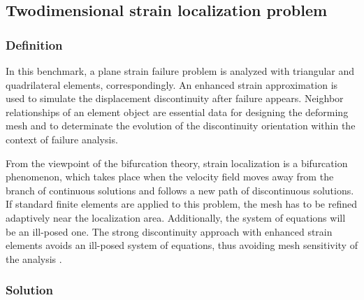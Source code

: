 \subsection{Twodimensional strain localization problem}
\label{subsec:Mp2}

\subsubsection{Definition}
\label{subsubsec:Mp2_def}

In this benchmark, a plane strain failure problem is analyzed with triangular and quadrilateral elements, correspondingly. An enhanced strain approximation is used to simulate the displacement discontinuity after failure appears. Neighbor relationships of an element object are essential data for designing the deforming mesh and to determinate the evolution of the discontinuity orientation within the context of failure analysis.

From the viewpoint of the bifurcation theory, strain localization is a bifurcation phenomenon, which takes place when the velocity field moves away from the branch of continuous solutions and follows a new
path of discontinuous solutions. If standard finite elements are applied to this problem, the mesh has to be refined adaptively near the localization area. Additionally, the system of equations will be an ill-posed one. The strong discontinuity approach with enhanced strain elements avoids an ill-posed system of equations, thus avoiding mesh sensitivity of the analysis \cite{SanWri84}.

\subsubsection{Solution}
\label{subsubsec:Mp2_sol}

